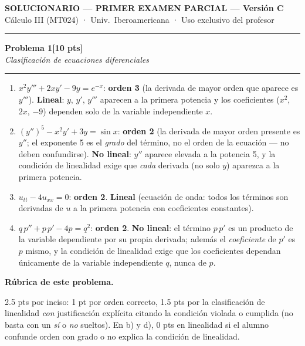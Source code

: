 \documentclass[11pt,letterpaper]{article}
\newcommand{\problema}[3]{%
  \bigskip\bigskip\noindent
  {\Large\textbf{Problema #1}}\hfill\textbf{[#2 pts]}\\[3pt]
  {\small\itshape #3}\par
  \vspace{2pt}\hrule\vspace{8pt}
}
\newenvironment{rubrica}{%
  \begin{mdframed}[linecolor=black,linewidth=0.6pt,
    innerleftmargin=8pt,innerrightmargin=8pt,innertopmargin=5pt,innerbottommargin=5pt]
  \small\textbf{Rúbrica de este problema.}\par\smallskip
}{\end{mdframed}}
\begin{document}
\begin{center}
{\Large\bfseries SOLUCIONARIO — PRIMER EXAMEN PARCIAL --- Versión C}\\[2pt]
{\small Cálculo III (MT024) · Univ.\ Iberoamericana · Uso exclusivo del profesor}
\end{center}

\vspace{4pt}\hrule

\vspace{10pt}

\problema{1}{10}{Clasificación de ecuaciones diferenciales}

\begin{enumerate}[label=\textbf{\alph*)}, itemsep=8pt]
  \item $x^2 y''' + 2x y' - 9y = e^{-x}$: \textbf{orden 3} (la derivada de mayor orden que aparece es $y'''$). \textbf{Lineal}: $y$, $y'$, $y'''$ aparecen a la primera potencia y los coeficientes ($x^2$, $2x$, $-9$) dependen solo de la variable independiente $x$.
  \item $(y'')^5 - x^2y' + 3y = \sin x$: \textbf{orden 2} (la derivada de mayor orden presente es $y''$; el exponente 5 es el \emph{grado} del término, no el orden de la ecuación — no deben confundirse). \textbf{No lineal}: $y''$ aparece elevada a la potencia 5, y la condición de linealidad exige que \emph{cada} derivada (no solo $y$) aparezca a la primera potencia.
  \item $u_{tt}-4u_{xx}=0$: \textbf{orden 2}. \textbf{Lineal} (ecuación de onda: todos los términos son derivadas de $u$ a la primera potencia con coeficientes constantes).
  \item $q\,p'' + p\,p' - 4p = q^2$: \textbf{orden 2}. \textbf{No lineal}: el término $p\,p'$ es un producto de la variable dependiente por su propia derivada; además el \emph{coeficiente} de $p'$ es $p$ mismo, y la condición de linealidad exige que los coeficientes dependan únicamente de la variable independiente $q$, nunca de $p$.
\end{enumerate}

\begin{rubrica}
2.5 pts por inciso: 1 pt por orden correcto, 1.5 pts por la clasificación de linealidad \emph{con} justificación explícita citando la condición violada o cumplida (no basta con un \emph{sí} o \emph{no} sueltos). En b) y d), 0 pts en linealidad si el alumno confunde orden con grado o no explica la condición de linealidad.
\end{rubrica}
\end{document}
